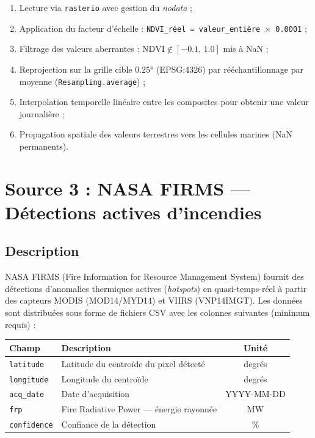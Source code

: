 \documentclass[12pt,a4paper]{report}
\begin{document}
\begin{enumerate}[leftmargin=*]
  \item Lecture via \texttt{rasterio} avec gestion du \emph{nodata} ;
  \item Application du facteur d'échelle : \texttt{NDVI\_réel = valeur\_entière $\times$ 0.0001} ;
  \item Filtrage des valeurs aberrantes : $\text{NDVI} \notin [-0.1,\, 1.0]$ mis à NaN ;
  \item Reprojection sur la grille cible $0.25°$ (EPSG:4326) par rééchantillonnage par
        moyenne (\texttt{Resampling.average}) ;
  \item Interpolation temporelle linéaire entre les composites pour obtenir une valeur
        journalière ;
  \item Propagation spatiale des valeurs terrestres vers les cellules marines (NaN permanents).
\end{enumerate}

\section{Source 3 : NASA FIRMS — Détections actives d'incendies}

\subsection{Description}

NASA FIRMS (Fire Information for Resource Management System) fournit des détections
d'anomalies thermiques actives (\emph{hotspots}) en quasi-temps-réel à partir des capteurs
MODIS (MOD14/MYD14) et VIIRS (VNP14IMGT). Les données sont distribuées sous forme de
fichiers CSV avec les colonnes suivantes (minimum requis) :

\begin{center}
\begin{tabular}{llc}
\toprule
\rowcolor{fireOrange!15}
\textbf{Champ}     & \textbf{Description}                          & \textbf{Unité} \\
\midrule
\texttt{latitude}  & Latitude du centroïde du pixel détecté        & degrés \\
\texttt{longitude} & Longitude du centroïde                        & degrés \\
\texttt{acq\_date} & Date d'acquisition                            & YYYY-MM-DD \\
\texttt{frp}       & Fire Radiative Power — énergie rayonnée        & MW \\
\texttt{confidence}& Confiance de la détection                     & \% \\
\bottomrule
\end{tabular}
\end{center}
\end{document}
